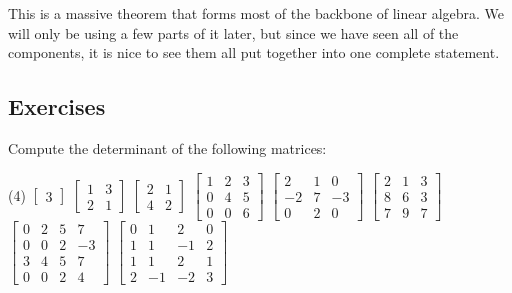 This is a massive theorem that forms most of the backbone of linear algebra. We will only be using a few parts of it later, but since we have seen all of the components, it is nice to see them all put together into one complete statement.

\subsection{Exercises}

\begin{exercise}
Compute the determinant of the following matrices:
\begin{tasks}(4)
\task
$\begin{bmatrix}
3
\end{bmatrix}$
\task
$\begin{bmatrix}
1 & 3 \\
2 & 1
\end{bmatrix}$
\task
$\begin{bmatrix}
2 & 1 \\
4 & 2
\end{bmatrix}$
\task
$\begin{bmatrix}
1 & 2 & 3 \\
0 & 4 & 5 \\
0 & 0 & 6
\end{bmatrix}$
\task
$\begin{bmatrix}
2 & 1 & 0 \\
-2 & 7 & -3 \\
0 & 2 & 0
\end{bmatrix}$
\task
$\begin{bmatrix}
2 & 1 & 3 \\
8 & 6 & 3 \\
7 & 9 & 7
\end{bmatrix}$
\task
$\begin{bmatrix}
0 & 2 & 5 & 7 \\
0 & 0 & 2 & -3 \\
3 & 4 & 5 & 7 \\
0 & 0 & 2 & 4
\end{bmatrix}$
\task
$\begin{bmatrix}
0 &  1 &  2 &  0 \\
1 &  1 & -1 & 2 \\
1 &  1 &  2 & 1 \\
2 & -1 & -2 & 3
\end{bmatrix}$
\end{tasks}
\end{exercise}

